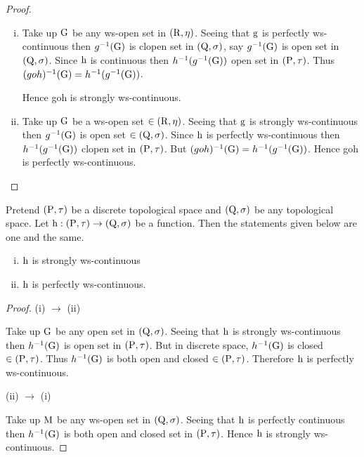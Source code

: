 \begin{proof}
\begin{enumerate}[(i)]
\item Take up $\mathrm{G}$ be any ws-open set in $(\mathrm{R},\eta)$. Seeing that $\mathrm{g}$ is perfectly ws-continuous then $g^{-1}(\mathrm{G})$ is clopen set in $(\mathrm{Q},\sigma)$, say $g^{-1}(\mathrm{G})$ is open set in $(\mathrm{Q},\sigma)$. Since $\mathrm{h}$ is continuous then $h^{-1} (g^{-1}(\mathrm{G}))$ open set in $(\mathrm{P},\tau)$. Thus $(goh)^{-1}(\mathrm{G}) = h^{-1} (g^{-1}(\mathrm{G}))$.

Hence goh is strongly ws-continuous.

\item Take up $\mathrm{G}$ be a ws-open set $\in (\mathrm{R}, \eta)$. Seeing that $\mathrm{g}$ is strongly ws-continuous then $g^{-1}(\mathrm{G})$ is open set $\in (\mathrm{Q},\sigma)$. Since $\mathrm{h}$ is perfectly ws-continuous then $h^{-1} (g^{-1}(\mathrm{G}))$ clopen set in $(\mathrm{P},\tau )$. But $(goh)^{-1}(\mathrm{G}) = h^{-1}(g^{-1}(\mathrm{G}))$. Hence goh is perfectly ws-continuous.
\end{enumerate}
\end{proof}

\begin{thm}\label{thm3.3.22}
Pretend $(\mathrm{P},\tau)$ be a discrete topological space and $(\mathrm{Q},\sigma)$ be any topological space. Let $\mathrm{h}: (\mathrm{P},\tau)\to (\mathrm{Q}, \sigma)$ be a function. Then the statements given below are one and the same.
\begin{enumerate}[(i)]
\item $\mathrm{h}$ is strongly ws-continuous
\item $\mathrm{h}$ is perfectly ws-continuous.
\end{enumerate}
\end{thm}

\begin{proof}
(i) $\to$ (ii)

Take up $\mathrm{G}$ be any open set in $(\mathrm{Q},\sigma)$. Seeing that $\mathrm{h}$ is strongly ws-continuous then $h^{-1}(\mathrm{G})$ is open set in $(\mathrm{P},\tau)$. But in discrete space, $h^{-1}(\mathrm{G})$ is closed $\in (\mathrm{P}, \tau)$. Thus $h^{-1}(\mathrm{G})$ is both open and closed $\in (\mathrm{P},\tau)$. Therefore $\mathrm{h}$ is perfectly ws-continuous.

(ii) $\to$ (i)

Take up $\mathrm{M}$ be any ws-open set in $(\mathrm{Q},\sigma)$. Seeing that $\mathrm{h}$ is perfectly continuous then $h^{-1}(\mathrm{G})$ is both open and closed set in $(\mathrm{P},\tau)$. Hence $\mathrm{h}$ is strongly ws-continuous.
\end{proof}

